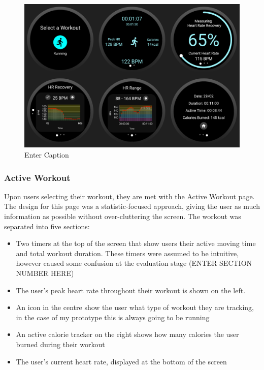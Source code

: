 \documentclass{l4proj}
\begin{document}
\begin{figure}[h!]
    \centering
    \includegraphics[width=1\linewidth]{dissertation//dissImages/ActiveWorkoutCombined.png}
    \caption{Enter Caption}
    \label{fig:enter-label}
\end{figure}

\subsubsection{Active Workout}

Upon users selecting their workout, they are met with the Active Workout page. The design for this page was a statistic-focused approach, giving the user as much information as possible without over-cluttering the screen. The workout was separated into five sections:

\begin{itemize}
    \item Two timers at the top of the screen that show users their active moving time and total workout duration. These timers were assumed to be intuitive, however caused some confusion at the evaluation stage (ENTER SECTION NUMBER HERE)
    \item The user’s peak heart rate throughout their workout is shown on the left.
    \item An icon in the centre show the user what type of workout they are tracking, in the case of my prototype this is always going to be running
    \item An active calorie tracker on the right shows how many calories the user burned during their workout
    \item The user’s current heart rate, displayed at the bottom of the screen
\end{itemize}
\end{document}
